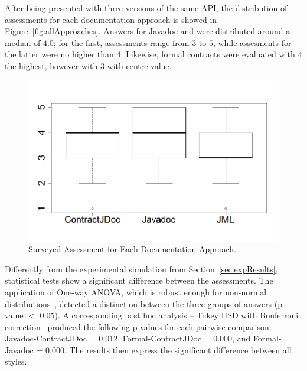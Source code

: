 After being presented with three versions of the same API, the distribution of assessments for each documentation approach is showed in Figure~\ref{fig:allApproaches}.
Answers for Javadoc and \contractjdoc{} were distributed around a median of $4.0$; for the first, assessments range from $3$ to $5$, while assesments for the latter were no higher than $4$.
Likewise, formal contracts were evaluated with $4$ the highest, however with $3$ with centre value. 

\begin{figure}
\centering
\includegraphics[width=0.7\linewidth]{figs/boxplotApproachesSurveyStudy}
\caption{Surveyed Assessment for Each Documentation Approach.}
\label{fig:surveyResults}
\end{figure}


Differently from the experimental simulation from Section~\ref{sec:expResults}, statistical tests show a significant difference between the assessments. The application of One-way ANOVA, which is robust enough for non-normal distributions~\cite{statistical}, detected a distinction between the three groups of answers (p-value $<$ 0.05). A corresponding post hoc analysis -- Tukey HSD 
with Bonferroni correction~\cite{statistical} produced the following p-values for each pairwise comparison: Javadoc-ContractJDoc = 0.012, Formal-ContractJDoc = 0.000, and Formal-Javadoc = 0.000. The results then express the significant difference between all styles.




